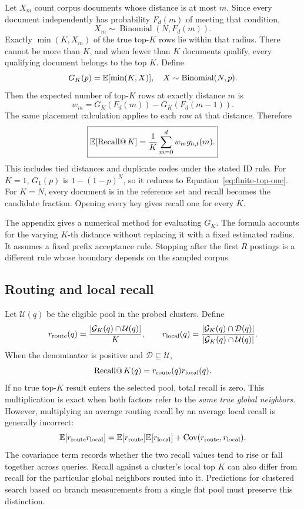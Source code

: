Let $X_m$ count corpus documents whose distance is at most $m$. Since every document independently
has probability $F_d(m)$ of meeting that condition,
\[
X_m\sim\operatorname{Binomial}(N,F_d(m)).
\]
Exactly $\min(K,X_m)$ of the true top-$K$ rows lie within that radius. There cannot be more
than $K$, and when fewer than $K$ documents qualify, every qualifying document belongs to the
top $K$. Define
\begin{equation}
G_K(p)=\mathbb E[\min(K,X)],\quad X\sim\operatorname{Binomial}(N,p).
\label{eq:clipped-binomial}
\end{equation}
Then the expected number of top-$K$ rows at exactly distance $m$ is
\[
w_m=G_K(F_d(m))-G_K(F_d(m-1)).
\]
The same placement calculation applies to each row at that distance. Therefore
\begin{equation}
\boxed{\mathbb E[\operatorname{Recall@}K]
=\frac{1}{K}\sum_{m=0}^{d}w_m g_{h,t}(m).}
\label{eq:finite-top-k}
\end{equation}
This includes tied distances and duplicate codes under the stated ID rule. For $K=1$, $G_1(p)$ is
$1-(1-p)^N$, so it reduces to Equation~\eqref{eq:finite-top-one}. For $K=N$, every document is
in the reference set and recall becomes the candidate fraction. Opening every key gives
recall one for every $K$.

The appendix gives a numerical method for evaluating $G_K$. The formula accounts for the
varying $K$-th distance without replacing it with a fixed estimated radius. It assumes a fixed
prefix acceptance rule. Stopping after the first $R$ postings is a
different rule whose boundary depends on the sampled corpus.

\subsection{Routing and local recall}
Let $\mathcal U(q)$ be the eligible pool in the probed clusters. Define
\[
r_{\rm route}(q)=\frac{|\mathcal G_K(q)\cap\mathcal U(q)|}{K},\qquad
r_{\rm local}(q)=\frac{|\mathcal G_K(q)\cap\mathcal D(q)|}
 {|\mathcal G_K(q)\cap\mathcal U(q)|}.
\]
When the denominator is positive and $\mathcal D\subseteq\mathcal U$,
\begin{equation}
\operatorname{Recall@}K(q)=r_{\rm route}(q)r_{\rm local}(q).
\label{eq:recall-stages}
\end{equation}
If no true top-$K$ result enters the selected pool, total recall is zero. This multiplication is
exact when both factors refer to the \emph{same true global neighbors}. However, multiplying
an average routing recall by an average local recall is generally incorrect:
\[
\mathbb E[r_{\rm route}r_{\rm local}]
=\mathbb E[r_{\rm route}]\mathbb E[r_{\rm local}]+\operatorname{Cov}(r_{\rm route},r_{\rm local}).
\]
The covariance term records whether the two recall values tend to rise or fall together across queries.
Recall against a cluster's local top $K$ can also differ from recall for the particular
global neighbors routed into it. Predictions for clustered search based on branch measurements
from a single flat pool must preserve this distinction.

